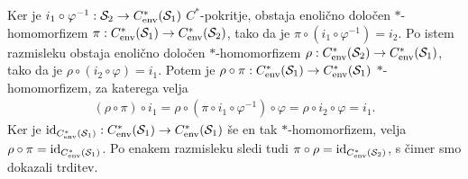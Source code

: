 \begin{dokaz}
    Ker je $i_1 \circ \varphi^{-1}: \mathcal{S}_2 \to C_{\operatorname{env}} ^* (\mathcal{S}_1)$ $C^*$-pokritje,
    obstaja enolično določen $*$-homomorfizem $\pi: C_{\operatorname{env}} ^* (\mathcal{S}_1) \to C_{\operatorname{env}} ^* (\mathcal{S}_2)$,
    tako da je $\pi \circ (i_1 \circ \varphi^{-1}) = i_2$. Po istem razmisleku obstaja 
    enolično določen $*$-homomorfizem $\rho: C_{\operatorname{env}} ^* (\mathcal{S}_2) \to C_{\operatorname{env}} ^* (\mathcal{S}_1)$, tako da je 
    $\rho \circ (i_2 \circ \varphi) = i_1$. Potem je $\rho \circ \pi: C_{\operatorname{env}} ^* (\mathcal{S}_1) \to C_{\operatorname{env}} ^* (\mathcal{S}_1)$ $*$-homomorfizem,
    za katerega velja 
    \begin{align*}
        (\rho \circ \pi) \circ i_1 = \rho \circ (\pi \circ i_1 \circ \varphi^{-1}) \circ \varphi = \rho \circ i_2 \circ \varphi = i_1.
    \end{align*}
    Ker je $\operatorname{id}_{C_{\operatorname{env}} ^* (\mathcal{S}_1)}: C_{\operatorname{env}} ^* (\mathcal{S}_1) \to C_{\operatorname{env}} ^* (\mathcal{S}_1)$ še en tak $*$-homomorfizem,
    velja $\rho \circ \pi = \operatorname{id}_{C_{\operatorname{env}} ^* (\mathcal{S}_1)}$. 
    Po enakem razmisleku sledi tudi $\pi \circ \rho = \operatorname{id}_{C_{\operatorname{env}} ^* (\mathcal{S}_2)}$, s čimer smo dokazali trditev.
\end{dokaz}

